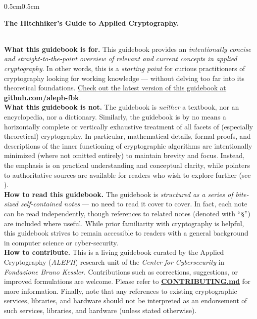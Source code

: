 \vspace*{\fill}
\begin{adjustwidth}{0.5cm}{0.5cm}
	
	\begin{center}
		\textbf{\Large The Hitchhiker's Guide to Applied Cryptography.}
	\end{center}
	
	~\\
	\textbf{What this guidebook is for.} This guidebook provides an \textit{intentionally concise and straight-to-the-point overview of relevant and current concepts in applied cryptography}. In other words, this is a \textit{starting point} for curious practitioners of cryptography looking for working knowledge --- without delving too far into its theoretical foundations. \underline{Check out the latest version of this guidebook at} \underline{\href{https://github.com/aleph-fbk/The-Hitchhiker-s-Guide-to-Applied-Cryptography}{\textbf{github.com/aleph-fbk}}}. \\
	
	\textbf{What this guidebook is not.} The guidebook is \textit{neither} a textbook, nor an encyclopedia, nor a dictionary. Similarly, the guidebook is by no means a horizontally complete or vertically exhaustive treatment of all facets of (especially theoretical) cryptography. In particular, mathematical details, formal proofs, and descriptions of the inner functioning of cryptographic algorithms are intentionally minimized (where not omitted entirely) to maintain brevity and focus. Instead, the emphasis is on practical understanding and conceptual clarity, while pointers to authoritative sources are available for readers who wish to explore further (see ). \\
	
	\textbf{How to read this guidebook.} The guidebook is \textit{structured as a series of bite-sized self-contained notes} --- no need to read it cover to cover. In fact, each note can be read independently, though references to related notes (denoted with ``\texttt{§}'') are included where useful. While prior familiarity with cryptography is helpful, this guidebook strives to remain accessible to readers with a general background in computer science or cyber-security. \\
	
	\textbf{How to contribute.} This is a living guidebook curated by the Applied Cryptography (\textit{ALEPH}) research unit of the \textit{Center for Cybersecurity} in \textit{Fondazione Bruno Kessler}. Contributions such as corrections, suggestions, or improved formulations are welcome. Please refer to \href{https://github.com/aleph-fbk/The-Hitchhiker-s-Guide-to-Applied-Cryptography/blob/main/CONTRIBUTING.md}{\underline{\textbf{CONTRIBUTING.md}}} for more information. Finally, note that any references to existing cryptographic services, libraries, and hardware should not be interpreted as an endorsement of such services, libraries, and hardware (unless stated otherwise). \\


\end{adjustwidth}
